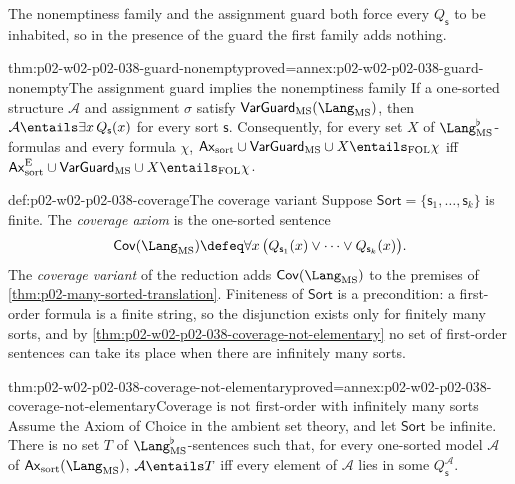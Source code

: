 The nonemptiness family and the assignment guard both force every
\(Q_{\mathsf s}\) to be inhabited, so in the presence of the guard the first
family adds nothing.

\begin{hblemma}{thm:p02-w02-p02-038-guard-nonempty}{proved=annex:p02-w02-p02-038-guard-nonempty}{The assignment guard implies the nonemptiness family}
If a one-sorted structure \(\mathcal A\) and assignment \(\sigma\) satisfy
\(\mathsf{VarGuard}_{\mathrm{MS}}(\Lang_{\mathrm{MS}})\), then
\(\mathcal A\entails\exists x\,Q_{\mathsf s}(x)\) for every sort
\(\mathsf s\).  Consequently, for every set \(X\) of
\(\Lang_{\mathrm{MS}}^{\flat}\)-formulas and every formula \(\chi\),
\(\mathsf{Ax}_{\mathrm{sort}}\cup\mathsf{VarGuard}_{\mathrm{MS}}\cup
X\entails_{\mathrm{FOL}}\chi\) iff
\(\mathsf{Ax}^{\mathrm E}_{\mathrm{sort}}\cup\mathsf{VarGuard}_{\mathrm{MS}}
\cup X\entails_{\mathrm{FOL}}\chi\).
\end{hblemma}

\begin{hbdefinition}{def:p02-w02-p02-038-coverage}{The coverage variant}
Suppose \(\mathsf{Sort}=\{\mathsf s_1,\ldots,\mathsf s_k\}\) is finite.  The
\emph{coverage axiom} is the one-sorted sentence
\[
 \mathsf{Cov}(\Lang_{\mathrm{MS}})\defeq
 \forall x\,\bigl(Q_{\mathsf s_1}(x)\lor\cdots\lor Q_{\mathsf s_k}(x)\bigr).
\]
The \emph{coverage variant} of the reduction adds
\(\mathsf{Cov}(\Lang_{\mathrm{MS}})\) to the premises of
\cref{thm:p02-many-sorted-translation}.  Finiteness of \(\mathsf{Sort}\) is
a precondition: a first-order formula is a finite string, so the disjunction
exists only for finitely many sorts, and by
\cref{thm:p02-w02-p02-038-coverage-not-elementary} no set of first-order
sentences can take its place when there are infinitely many sorts.
\end{hbdefinition}

\begin{hbtheorem}{thm:p02-w02-p02-038-coverage-not-elementary}{proved=annex:p02-w02-p02-038-coverage-not-elementary}{Coverage is not first-order with infinitely many sorts}
Assume the Axiom of Choice in the ambient set theory, and let
\(\mathsf{Sort}\) be infinite.  There is no set \(T\) of
\(\Lang_{\mathrm{MS}}^{\flat}\)-sentences such that, for every one-sorted
model \(\mathcal A\) of \(\mathsf{Ax}_{\mathrm{sort}}(\Lang_{\mathrm{MS}})\),
\(\mathcal A\entails T\) iff every element of \(\mathcal A\) lies in some
\(Q_{\mathsf s}^{\mathcal A}\).
\end{hbtheorem}

